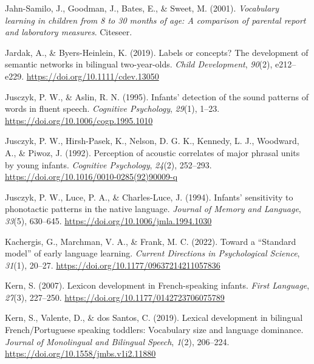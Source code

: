 \documentclass[
  12pt,
  b5paperpaper,
  twoside]{scrreprt}
\newlength{\cslhangindent}
\newlength{\cslentryspacingunit} %
\newenvironment{CSLReferences}[2] %
 {%
  \setlength{\parindent}{0pt}
  \ifodd #1
  \let\oldpar\par
  \def\par{\hangindent=\cslhangindent\oldpar}
  \fi
  \setlength{\parskip}{#2\cslentryspacingunit}
 }%
 {}
\begin{document}
\begin{CSLReferences}{1}{0}
\leavevmode{}%
Jahn-Samilo, J., Goodman, J., Bates, E., \& Sweet, M. (2001).
\emph{Vocabulary learning in children from 8 to 30 months of age: A
comparison of parental report and laboratory measures}. {Citeseer}.

\leavevmode{}%
Jardak, A., \& Byers-Heinlein, K. (2019). Labels or concepts? {The}
development of semantic networks in bilingual two-year-olds. \emph{Child
Development}, \emph{90}(2), e212--e229.
\url{https://doi.org/10.1111/cdev.13050}

\leavevmode{}%
Jusczyk, P. W., \& Aslin, R. N. (1995). Infants' detection of the sound
patterns of words in fluent speech. \emph{Cognitive Psychology},
\emph{29}(1), 1--23. \url{https://doi.org/10.1006/cogp.1995.1010}

\leavevmode{}%
Jusczyk, P. W., Hirsh-Pasek, K., Nelson, D. G. K., Kennedy, L. J.,
Woodward, A., \& Piwoz, J. (1992). Perception of acoustic correlates of
major phrasal units by young infants. \emph{Cognitive Psychology},
\emph{24}(2), 252--293.
\url{https://doi.org/10.1016/0010-0285(92)90009-q}

\leavevmode{}%
Jusczyk, P. W., Luce, P. A., \& Charles-Luce, J. (1994). Infants'
sensitivity to phonotactic patterns in the native language.
\emph{Journal of Memory and Language}, \emph{33}(5), 630--645.
\url{https://doi.org/10.1006/jmla.1994.1030}

\leavevmode{}%
Kachergis, G., Marchman, V. A., \& Frank, M. C. (2022). Toward a
{``{Standard} model''} of early language learning. \emph{Current
Directions in Psychological Science}, \emph{31}(1), 20--27.
\url{https://doi.org/10.1177/09637214211057836}

\leavevmode{}%
Kern, S. (2007). Lexicon development in {French-speaking} infants.
\emph{First Language}, \emph{27}(3), 227--250.
\url{https://doi.org/10.1177/0142723706075789}

\leavevmode{}%
Kern, S., Valente, D., \& dos Santos, C. (2019). Lexical development in
bilingual {French}/{Portuguese} speaking toddlers: Vocabulary size and
language dominance. \emph{Journal of Monolingual and Bilingual Speech},
\emph{1}(2), 206--224. \url{https://doi.org/10.1558/jmbs.v1i2.11880}


\end{CSLReferences}
\end{document}
